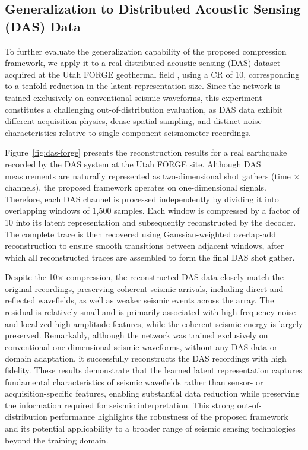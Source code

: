 \documentclass[fleqn,10pt]{wlscirep}
\begin{document}
\subsection{Generalization to Distributed Acoustic Sensing (DAS) Data}
\label{subsec:das}

To further evaluate the generalization capability of the proposed compression framework, we apply it to a real distributed acoustic sensing (DAS) dataset acquired at the Utah FORGE geothermal field \cite{dasdenoising2023}, using a CR of 10, corresponding to a tenfold reduction in the latent representation size. Since the network is trained exclusively on conventional seismic waveforms, this experiment constitutes a challenging out-of-distribution evaluation, as DAS data exhibit different acquisition physics, dense spatial sampling, and distinct noise characteristics relative to single-component seismometer recordings.

Figure~\ref{fig:das-forge} presents the reconstruction results for a real earthquake recorded by the DAS system at the Utah FORGE site. Although DAS measurements are naturally represented as two-dimensional shot gathers (time $\times$ channels), the proposed framework operates on one-dimensional signals. Therefore, each DAS channel is processed independently by dividing it into overlapping windows of 1,500 samples. Each window is compressed by a factor of 10 into its latent representation and subsequently reconstructed by the decoder. The complete trace is then recovered using Gaussian-weighted overlap-add reconstruction to ensure smooth transitions between adjacent windows, after which all reconstructed traces are assembled to form the final DAS shot gather.

Despite the 10$\times$ compression, the reconstructed DAS data closely match the original recordings, preserving coherent seismic arrivals, including direct and reflected wavefields, as well as weaker seismic events across the array. The residual is relatively small and is primarily associated with high-frequency noise and localized high-amplitude features, while the coherent seismic energy is largely preserved. Remarkably, although the network was trained exclusively on conventional one-dimensional seismic waveforms, without any DAS data or domain adaptation, it successfully reconstructs the DAS recordings with high fidelity. These results demonstrate that the learned latent representation captures fundamental characteristics of seismic wavefields rather than sensor- or acquisition-specific features, enabling substantial data reduction while preserving the information required for seismic interpretation. This strong out-of-distribution performance highlights the robustness of the proposed framework and its potential applicability to a broader range of seismic sensing technologies beyond the training domain.
\end{document}

